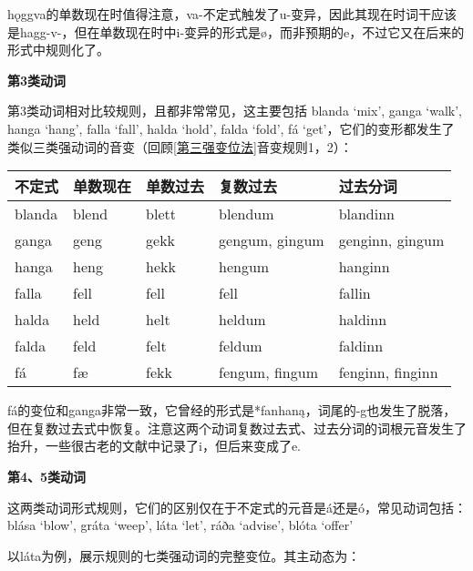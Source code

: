hǫggva的单数现在时值得注意，va-不定式触发了u-变异，因此其现在时词干应该是hagg-v-，但在单数现在时中i-变异的形式是ø，而非预期的e，不过它又在后来的形式中规则化了。

\textbf{第3类动词}

第3类动词相对比较规则，且都非常常见，这主要包括 blanda `mix', ganga
`walk', hanga `hang', falla `fall', halda `hold', falda `fold', fá
`get'，它们的变形都发生了类似三类强动词的音变（回顾\ref{第三强变位法}音变规则1，2）：

\begin{longtable}{lllll}
  \toprule
  不定式 & 单数现在 & 单数过去 & 复数过去       & 过去分词         \\
  \midrule
  \endhead
  \bottomrule
  \endfoot
  blanda & blend    & blett    & blendum        & blandinn         \\
  ganga  & geng     & gekk     & gengum, gingum & genginn, gingum  \\
  hanga  & heng     & hekk     & hengum         & hanginn          \\
  falla  & fell     & fell     & fell           & fallin           \\
  halda  & held     & helt     & heldum         & haldinn          \\
  falda  & feld     & felt     & feldum         & faldinn          \\
  fá     & fæ       & fekk     & fengum, fingum & fenginn, finginn \\
\end{longtable}

fá的变位和ganga非常一致，它曾经的形式是*fanhaną，词尾的-g也发生了脱落，但在复数过去式中恢复。注意这两个动词复数过去式、过去分词的词根元音发生了抬升，一些很古老的文献中记录了i，但后来变成了e.

\textbf{第4、5类动词}

这两类动词形式规则，它们的区别仅在于不定式的元音是á还是ó，常见动词包括：blása
`blow', gráta `weep', láta `let', ráða `advise', blóta `offer‌'

以láta为例，展示规则的七类强动词的完整变位。其主动态为：

